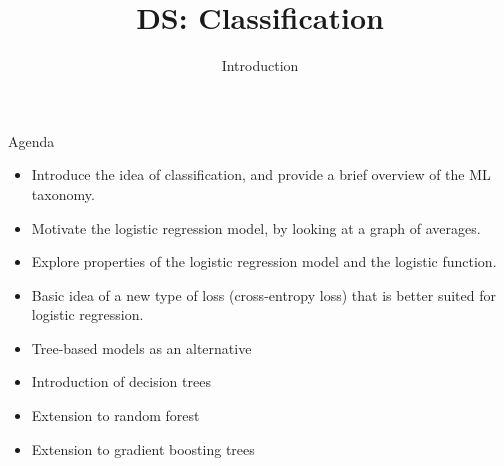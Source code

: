 \documentclass[aspectratio=169]{../latex_main/tntbeamer}  %
\title[Introduction]{DS: Classification}
\subtitle{Introduction}
\begin{document}
	
	\maketitle
	\begin{frame}[c]{Agenda}
	    \begin{itemize}
	        \item Introduce the idea of classification, and provide a brief overview of the ML taxonomy.
	        \item Motivate the logistic regression model, by looking at a graph of averages.
	        \item Explore properties of the logistic regression model and the logistic function.
	        \item Basic idea of a new type of loss (cross-entropy loss) that is better suited for logistic regression.
	        \pause
	        \bigskip
	        \item Tree-based models as an alternative
	        \item Introduction of decision trees
	        \item Extension to random forest
	        \item Extension to gradient boosting trees
	    \end{itemize}
	\end{frame}
	
\end{document}
